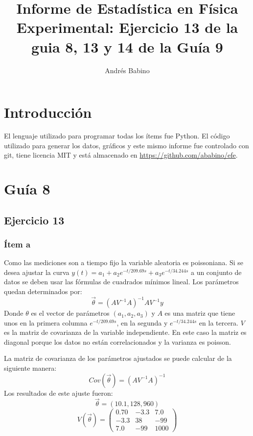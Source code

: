 \title{Informe de Estadística en Física Experimental: Ejercicio 13 de la guia 8,  13 y 14 de la  Guía 9}
\author{Andrés Babino}


\maketitle
\section{Introducción}
El lenguaje utilizado para programar todas los ítems fue Python.
El código utilizado para generar los datos, gráficos y este mismo informe fue controlado con git, tiene licencia MIT y está almacenado en \url{https://github.com/ababino/efe}.

\section*{Guía 8}
\subsection*{Ejercicio 13}
\subsubsection*{Ítem a}
Como las mediciones son a tiempo fijo la variable aleatoria es poissoniana.
Si se desea ajustar la curva $y(t) = a_1 + a_2 e^{-t/209.69s} + a_3 e^{-t/34.244s}$ a un conjunto de datos se deben usar las fórmulas de cuadrados mínimos lineal.
Los parámetros quedan determinados por:
$$
\vec{\theta} = {(AV^{-1}A)}^{-1}AV^{-1}y
$$
Donde $\theta$ es el vector de parámetros $(a_1, a_2, a_3)$ y $A$ es una matriz que tiene unos en la primera columna $e^{-t/209.69s}$, en la segunda y $e^{-t/34.244s}$ en la tercera.
$V$ es la matriz de covarianza de la variable independiente.
En este caso la matriz es diagonal porque los datos no están correlacionados y la varianza es poisson.

La matriz de covarianza de los parámetros ajustados se puede calcular de la siguiente manera:
$$
Cov(\vec{\theta}) = {(AV^{-1}A)}^{-1}
$$
Los resultados de este ajuste fueron:
$$
\vec{\theta} = (10.1, 128, 960)
$$
$$
V(\vec{\theta}) =\left(
\begin{matrix}
0.70 &-3.3 & 7.0 \\
-3.3 & 38 &-99 \\
7.0  & -99 & 1000
\end{matrix} \right)
$$

